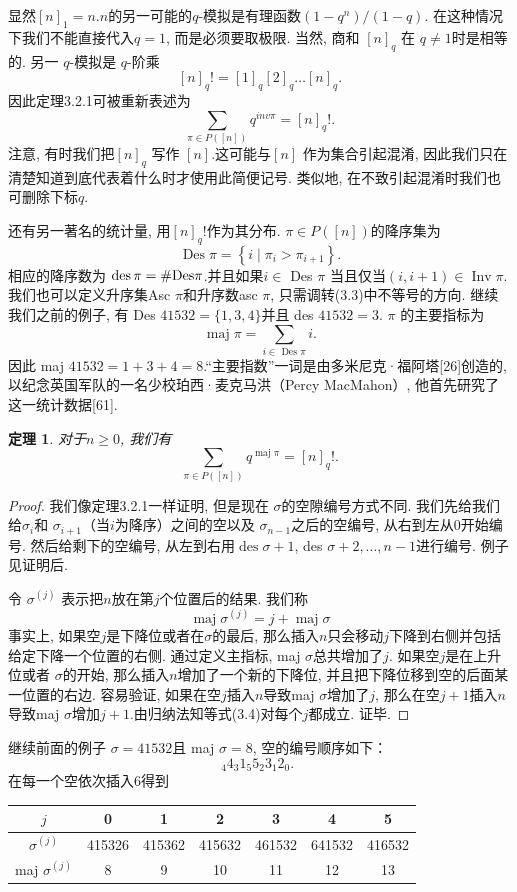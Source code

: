 \documentclass[a4paper,12pt]{ctexbook}
\newtheorem{theorem}[lemma]{\hspace{2em}定理}%
\begin{document}
显然$[n]_{1}=n .$$n$的另一可能的$q$-模拟是有理函数$\left(1-q^{n}\right) / (1-q) .$ 在这种情况下我们不能直接代入$q=1$, 而是必须要取极限. 当然, 商和 $[n]_{q}$ 在 $q \neq 1$时是相等的. 另一  $q$-模拟是 $q$-阶乘
$$
[n]_{q} !=[1]_{q}[2]_{q} \ldots[n]_{q} .
$$
因此定理3.2.1可被重新表述为
$$
\sum_{\pi \in P([n])} q^{i n v \pi}=[n]_{q} !.
$$
注意, 有时我们把$[n]_{q}$ 写作 $[n]$.这可能与$[n]$ 作为集合引起混淆, 因此我们只在清楚知道到底代表着什么时才使用此简便记号. 类似地, 在不致引起混淆时我们也可删除下标$q$.

还有另一著名的统计量, 用$[n]_{q} !$作为其分布.  $\pi \in P([n])$的{\kaishu 降序集}为
\[
\operatorname{Des} \pi=\left\{i \mid \pi_{i}>\pi_{i+1}\right\}.\tag{3.3}
\]
相应的{\kaishu 降序数}为 $\operatorname{des} \pi= \# {\rm Des}\pi$.并且如果$i \in$ Des $\pi$ 当且仅当$(i, i+1) \in \operatorname{Inv} \pi$.我们也可以定义{\kaishu 升序集}Asc $\pi$和{\kaishu 升序数}asc $\pi$, 只需调转(3.3)中不等号的方向. 继续我们之前的例子, 有  Des $41532=\{1,3,4\}$并且 des $41532=3$.  $\pi$ 的{\kaishu 主要指标}为
$$
\operatorname{maj} \pi=\sum_{i \in \text { Des } \pi} i .
$$
因此 maj $41532=1+3+4=8$.“主要指数”一词是由多米尼克·福阿塔[26]创造的, 以纪念英国军队的一名少校珀西·麦克马洪（Percy MacMahon）, 他首先研究了这一统计数据[61].
\begin{theorem}
	对于$n\geq 0$, 我们有
	$$
	\sum_{\pi \in P([n])} q^{\operatorname{maj} \pi}=[n]_{q} !.
	$$
\end{theorem}
\begin{proof}
	我们像定理3.2.1一样证明, 但是现在 $\sigma$的空隙编号方式不同. 我们先给我们给$\sigma_{i}$和 $\sigma_{i+1}$（当$i$为降序）之间的空以及 $\sigma_{n-1}$之后的空编号, 从右到左从0开始编号. 然后给剩下的空编号, 从左到右用$\operatorname{des} \sigma+1$, des $\sigma+2, \ldots, n-1$进行编号. 例子见证明后.

	令 $\sigma^{(j)}$ 表示把$n$放在第$j$个位置后的结果. 我们称
\[
	\operatorname{maj} \sigma^{(j)}=j+\operatorname{maj} \sigma \tag{3.4}
\]
	事实上, 如果空$j$是下降位或者在$\sigma$的最后, 那么插入$n$只会移动$j$下降到右侧并包括给定下降一个位置的右侧. 通过定义主指标, maj $\sigma$总共增加了$j$. 如果空$j$是在上升位或者 $\sigma$的开始, 那么插入$n$增加了一个新的下降位, 并且把下降位移到空的后面某一位置的右边. 容易验证, 如果在空$j$插入$n$导致maj $\sigma$增加了$j$, 那么在空$j+1$插入$n$导致maj $\sigma$增加$j+1$.由归纳法知等式(3.4)对每个$j$都成立. 证毕.
\end{proof}

继续前面的例子 $\sigma=41532$且 maj $\sigma=8$, 空的编号顺序如下：
$$
{ }_{4} 4_{3} 1_{5} 5_{2} 3_{1} 2_{0} \text {. }
$$
在每一个空依次插入6得到
\begin{table}[h]
	\centering
	\begin{tabular}{c||c|c|c|c|c|c}
		$j$ & 0 & 1 & 2 & 3 & 4 & 5 \\
		\hline$\sigma^{(j)}$ & 415326 & 415362 & 415632 & 461532 & 641532 & 416532 \\
		\hline maj $\sigma^{(j)}$ & 8 & 9 & 10 & 11 & 12 & 13
	\end{tabular}
\end{table}
\end{document}
